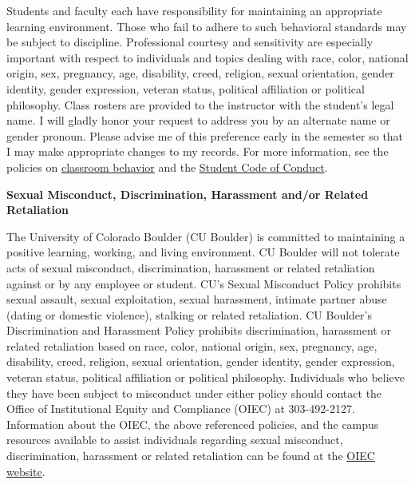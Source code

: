 \documentclass[11pt]{article}
\begin{document}
Students and faculty each have responsibility for maintaining an appropriate learning environment. Those who fail to adhere to such behavioral standards may be subject to discipline. Professional courtesy and sensitivity are especially important with respect to individuals and topics dealing with race, color, national origin, sex, pregnancy, age, disability, creed, religion, sexual orientation, gender identity, gender expression, veteran status, political affiliation or political philosophy. Class rosters are provided to the instructor with the student's legal name. I will gladly honor your request to address you by an alternate name or gender pronoun. Please advise me of this preference early in the semester so that I may make appropriate changes to my records. For more information, see the policies on \href{http://www.colorado.edu/policies/student-classroom-and-course-related-behavior}{classroom behavior} and the \href{http://www.colorado.edu/osccr/}{Student Code of Conduct}.


\bigskip
\textbf{\normalsize Sexual Misconduct, Discrimination, Harassment and/or Related Retaliation}

The University of Colorado Boulder (CU Boulder) is committed to maintaining a positive learning, working, and living environment. CU Boulder will not tolerate acts of sexual misconduct, discrimination, harassment or related retaliation against or by any employee or student. CU’s Sexual Misconduct Policy prohibits sexual assault, sexual exploitation, sexual harassment, intimate partner abuse (dating or domestic violence), stalking or related retaliation. CU Boulder’s Discrimination and Harassment Policy prohibits discrimination, harassment or related retaliation based on race, color, national origin, sex, pregnancy, age, disability, creed, religion, sexual orientation, gender identity, gender expression, veteran status, political affiliation or political philosophy. Individuals who believe they have been subject to misconduct under either policy should contact the Office of Institutional Equity and Compliance (OIEC) at 303-492-2127. Information about the OIEC, the above referenced policies, and the campus resources available to assist individuals regarding sexual misconduct, discrimination, harassment or related retaliation can be found at the \href{http://www.colorado.edu/institutionalequity/}{OIEC website}.

\end{document}
